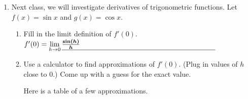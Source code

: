 \documentclass{article}
\begin{document}
\begin{enumerate}
\begin{problem}
    Explain how the graph of $f(x) = \sin x$ indicates that it is not a polynomial function. Refer to the number of $x$-intercepts, the number of
    turning points, and the end behavior.
  \end{problem}
  
    \begin{solution}
     The graph of $y=\sin(x)$ has
    infinitely many $x$-intercepts and turning points, and $\displaystyle \lim_{x
      \to \infty} \sin x$ and $\displaystyle \lim_{x \to -\infty} \sin x$ do not
    exist because both ``ends'' of the graph oscillate between $-1$ and
    $1$ forever.  So, $\sin x$ cannot be a polynomial. 
  \end{solution}
  
  \pspace{2in}
  
  \begin{problemonly}   
    {\it Although $\sin x$ isn't a polynomial, in Math 1b, you'll learn how it is like a ``polynomial of infinite
      degree.'' \[ \sin x = x -
      \tfrac{1}{6}x^3 + \tfrac{1}{120}x^5 -
      \tfrac{1}{5040}x^7 + \tfrac{1}{362880}x^9-\cdots\] }
      \end{problemonly}
\pspace{-36pt}

      \pspace{\newpage}

\item

\begin{problem}
    Next class, we will investigate derivatives of trigonometric functions. Let $f(x)=\sin x$ and $g(x)=\cos x$.
\end{problem}

\begin{enumerate}
    \item 
    \begin{problem}
    Fill in the limit definition of $f'(0)$. $f'(0) = \displaystyle
      \lim_{h \to 0} \fitb[\vphantom{\dfrac{0}{0}}]{3in}{\frac{\sin(h)}{h}}$
      \end{problem}

    \item 
    \begin{problem}
    Use a calculator to find approximations of $f'(0)$. (Plug in values of $h$ close to $0$.) Come up with a guess for the exact value.
      \end{problem}
      \pspace{\vfill}

    \begin{solution}
        Here is a table of a few approximations.
        

\end{solution}
\end{enumerate}
\end{enumerate}
\end{document}
